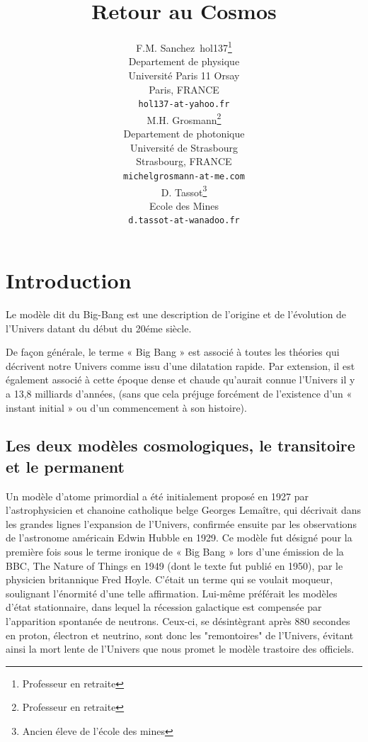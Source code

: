 \documentclass[a4paper,12pt]{article}
\title{Retour au Cosmos}
\author{
  F.M. Sanchez~hol137\thanks{Professeur en retraite} \\
  Departement de physique\\
  Université Paris 11 Orsay \\
  Paris, FRANCE \\
  \texttt{hol137-at-yahoo.fr} \\
   \And
 M.H. Grosmann\thanks{Professeur en retraite} \\
  Departement de photonique\\
  Université de Strasbourg\\
  Strasbourg, FRANCE \\
  \texttt{michelgrosmann-at-me.com} \\
   \And
 D. Tassot\thanks{Ancien éleve de l'école des mines} \\
  Ecole des Mines\\
  \texttt{d.tassot-at-wanadoo.fr} \\
}
\begin{document}
\maketitle

\tableofcontents
\clearpage

\section*{Introduction}


Le modèle dit du Big-Bang est une description de l'origine et de l'évolution de l’Univers datant du début du 20éme siècle.

De façon générale, le terme « Big Bang » est associé à toutes les théories qui décrivent notre Univers comme issu d'une dilatation rapide. Par extension, il est également associé à cette époque dense et chaude qu’aurait connue l’Univers il y a 13,8 milliards d’années, (sans que cela préjuge forcément de l’existence d’un « instant initial » ou d’un commencement à son histoire).

\subsection{Les deux modèles cosmologiques, le transitoire et le permanent}
\label{sec:headings}

Un modèle d'atome primordial a été initialement proposé en 1927 par l'astrophysicien  et chanoine catholique belge Georges Lemaître, qui décrivait dans les grandes lignes l’expansion de l'Univers, confirmée ensuite par les observations de l'astronome américain Edwin Hubble en 1929. Ce modèle fut désigné pour la première fois sous le terme ironique de « Big Bang » lors d’une émission de la BBC, The Nature of Things en 1949 (dont le texte fut publié en 1950), par le physicien britannique Fred Hoyle. C'était un terme qui se voulait moqueur, soulignant l'énormité d'une telle affirmation. Lui-même préférait les modèles d'état stationnaire, dans lequel la récession galactique est compensée par l'apparition spontanée de neutrons. Ceux-ci, se désintègrant après 880 secondes en proton, électron et neutrino, sont donc les "remontoires" de l'Univers, évitant ainsi la mort lente de l'Univers que nous promet le modèle trastoire des officiels.
\end{document}
